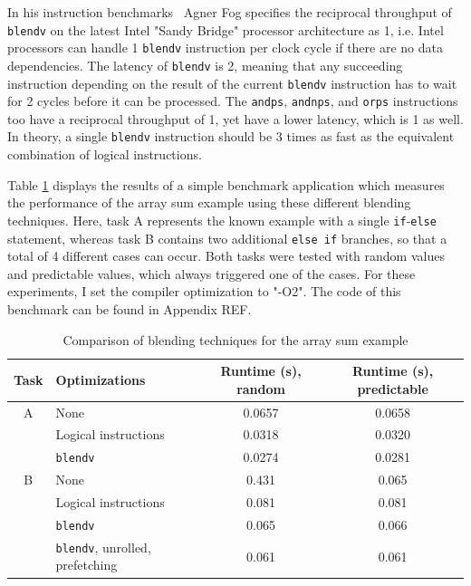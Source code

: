 In his instruction benchmarks~\cite[p. 44]{fog2011instructiontables} Agner Fog specifies the reciprocal throughput of \texttt{blendv} on the latest Intel "Sandy Bridge" processor architecture as 1, i.e. Intel processors can handle 1 \texttt{blendv} instruction per clock cycle if there are no data dependencies. The latency of \texttt{blendv} is 2, meaning that any succeeding instruction depending on the result of the current \texttt{blendv} instruction has to wait for 2 cycles before it can be processed. The \texttt{andps}, \texttt{andnps}, and \texttt{orps} instructions too have a reciprocal throughput of 1, yet have a lower latency, which is 1 as well. In theory, a single \texttt{blendv} instruction should be 3 times as fast as the equivalent combination of logical instructions.

Table \ref{blending_table} displays the results of a simple benchmark application which measures the performance of the array sum example using these different blending techniques. Here, task A represents the known example with a single \texttt{if}-\texttt{else} statement, whereas task B contains two additional \texttt{else if} branches, so that a total of 4 different cases can occur. Both tasks were tested with random values and predictable values, which always triggered one of the cases. For these experiments, I set the compiler optimization to "-O2". The code of this benchmark can be found in Appendix REF. 

\begin{table}[h]
\begin{center}
\begin{tabular}{clcc}
\toprule
Task & Optimizations & Runtime (s), random & Runtime (s), predictable \\
\midrule
A & None & 0.0657 & 0.0658 \\
& Logical instructions & 0.0318 & 0.0320 \\
& \texttt{blendv} & 0.0274 & 0.0281 \\
\addlinespace
B & None & 0.431 & 0.065 \\
& Logical instructions & 0.081 & 0.081 \\
& \texttt{blendv} & 0.065 & 0.066 \\
& \texttt{blendv}, unrolled, prefetching & 0.061 & 0.061 \\
\bottomrule
\end{tabular}
\caption{Comparison of blending techniques for the array sum example}
\label{blending_table}
\end{center}
\end{table}

